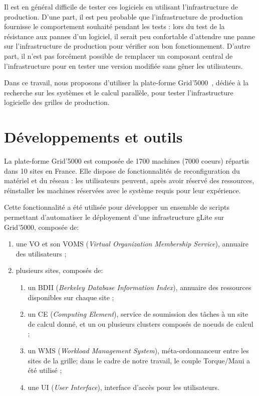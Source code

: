 \documentclass[a4paper,11pt]{article}
\begin{document}
Il est en général difficile de tester ces logiciels en utilisant
l'infrastructure de production. D'une part, il est peu probable que
l'infrastructure de production fournisse le comportement souhaité pendant les
tests : lors du test de la résistance aux pannes d'un logiciel, il serait peu
confortable d'attendre une panne sur l'infrastructure de production pour
vérifier son bon fonctionnement. D'autre part, il n'est pas forcément possible
de remplacer un composant central de l'infrastructure pour en tester une
version modifiée sans gêner les utilisateurs.

Dans ce travail, nous proposons d'utiliser la plate-forme
Grid'5000~\cite{grid5000,grid5000web}, dédiée à la recherche sur les systèmes
et le calcul parallèle, pour tester l'infrastructure logicielle des grilles de
production.

\section{Développements et outils}

La plate-forme Grid'5000 est composée de 1700 machines (7000 coeurs) répartis
dans 10 sites en France. Elle dispose de fonctionnalités de reconfiguration du
matériel et du réseau : les utilisateurs peuvent, après avoir réservé des
ressources, réinstaller les machines réservées avec le système requis pour leur
expérience.

Cette fonctionnalité a été utilisée pour développer un ensemble de scripts
permettant d'automatiser le déployement d'une infrastructure gLite sur
Grid'5000, composée de:

\begin{enumerate}

\item une VO et son VOMS (\textsl{Virtual Organization Membership Service}),
	annuaire des utilisateurs ;

\item plusieurs sites, composés de:

\begin{enumerate}

	\item un BDII (\textsl{Berkeley Database Information Index}), annuaire
		des ressources disponibles sur chaque site ;

	\item un CE (\textsl{Computing Element}), service de soumission des
		tâches à un site de calcul donné, et un ou plusieurs clusters composés de noeuds de calcul ;

	\item un WMS (\textsl{Workload Management System}), méta-ordonnanceur entre les sites de la grille; dans le cadre de
		notre travail, le couple Torque/Maui a été utilisé ;

	\item une UI (\textsl{User Interface}), interface d'accès pour les
		utilisateurs.

\end{enumerate}
\end{enumerate}
\end{document}
